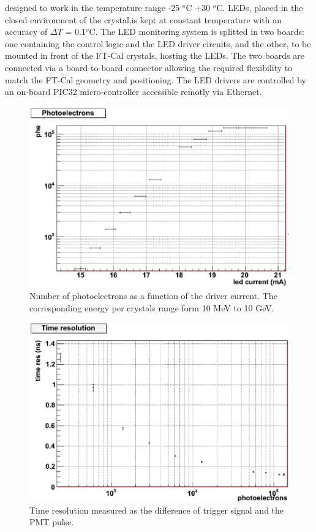 designed to work in the temperature range -25 $^o$C +30 
$^o$C. LEDs, placed in the closed
environment of the crystal,is kept at
constant temperature with an accuracy of $\Delta T$ =
0.1$^o$C. The LED monitoring system is splitted in two
boards: one containing the control logic and
the LED driver circuits, and the other, to be
mounted in front of the FT-Cal crystals, hosting
the LEDs. The two boards are connected
via a board-to-board connector allowing the
required flexibility to match the FT-Cal geometry
and positioning. The LED drivers are controlled by an on-board PIC32 micro-controller accessible remotly  via Ethernet.
\begin{figure}[th!]
\centering 
\includegraphics[width=1.0\columnwidth]{./fig/dynamics.eps}
\caption{Number of photoelectrons as a function
of the driver current. The corresponding energy
per crystals range form 10 MeV to 10 GeV.}
\label{fig:LEDper1} 
\end{figure}
\begin{figure}[th!]
\centering 
\includegraphics[width=1.0\columnwidth]{./fig/timing.eps}
\caption{Time resolution measured as the difference of trigger signal and the PMT pulse.}
\label{fig:LEDper2} 
\end{figure}

